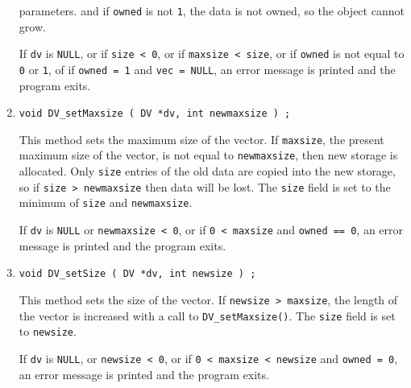 \begin{enumerate}
parameters.
and if {\tt owned} is not {\tt 1}, the data is not owned, so the
object cannot grow.
\par {}
If {\tt dv} is {\tt NULL}, 
or if {\tt size < 0},
or if {\tt maxsize < size},
or if {\tt owned} is not equal to {\tt 0} or {\tt 1},
of if { \tt owned = 1} and {\tt vec = NULL},
an error message is printed and the program exits.
\item
\begin{verbatim}
void DV_setMaxsize ( DV *dv, int newmaxsize ) ;
\end{verbatim}
This method sets the maximum size of the vector.
If {\tt maxsize}, the present maximum size of the vector,
is not equal to {\tt newmaxsize}, then new storage is allocated.
Only {\tt size}
entries of the old data are copied into the new
storage, so if {\tt size > newmaxsize} then data will be lost.
The {\tt size} field is set to the minimum of {\tt size} 
and {\tt newmaxsize}.
\par {}
If {\tt dv} is {\tt NULL} or {\tt newmaxsize < 0},
or if {\tt 0 < maxsize} and {\tt owned == 0},
an error message is printed and the program exits.
\item
\begin{verbatim}
void DV_setSize ( DV *dv, int newsize ) ;
\end{verbatim}
This method sets the size of the vector.
If {\tt newsize > maxsize}, the length of the vector is increased
with a call to {\tt DV\_setMaxsize()}.
The {\tt size} field is set to {\tt newsize}.
\par {}
If {\tt dv} is {\tt NULL}, or {\tt newsize < 0},
or if {\tt 0 < maxsize < newsize} and {\tt owned = 0},
an error message is printed and the program exits.
\end{enumerate}
\par

